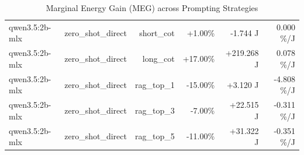 \begin{table}[t]
\begin{tabular}{lrrrrr}
qwen3.5:2b-mlx & zero\_shot\_direct & short\_cot & +1.00\% & -1.744 J & 0.000 \%/J \\
qwen3.5:2b-mlx & zero\_shot\_direct & long\_cot & +17.00\% & +219.268 J & 0.078 \%/J \\
qwen3.5:2b-mlx & zero\_shot\_direct & rag\_top\_1 & -15.00\% & +3.120 J & -4.808 \%/J \\
qwen3.5:2b-mlx & zero\_shot\_direct & rag\_top\_3 & -7.00\% & +22.515 J & -0.311 \%/J \\
qwen3.5:2b-mlx & zero\_shot\_direct & rag\_top\_5 & -11.00\% & +31.322 J & -0.351 \%/J \\
\bottomrule
\end{tabular}
\caption{Marginal Energy Gain (MEG) across Prompting Strategies}
\label{tab:3_marginal_energy_gain}
\end{table}
